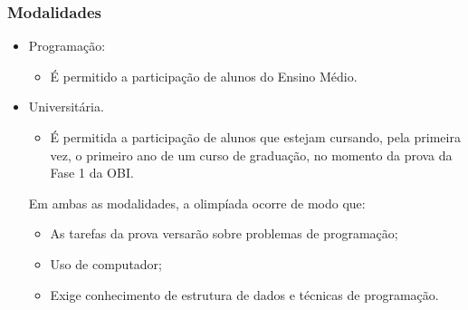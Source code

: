 \begin{frame}
 \frametitle{Modalidades}
 \begin{itemize}
  \item Programação:
  \begin{itemize}
   \item É permitido a participação de alunos do Ensino Médio.
  \end{itemize}

  \item Universitária.
  \begin{itemize}
   \item É permitida a participação de alunos que estejam cursando, pela primeira vez,
   o primeiro ano de um curso de graduação, no momento da prova da Fase 1 da OBI.
  \end{itemize}

  Em ambas as modalidades, a olimpíada ocorre de modo que:
  \begin{itemize}
   \item As tarefas da prova versarão sobre problemas de programação;
   \item Uso de computador;
   \item Exige conhecimento de estrutura de dados e técnicas de programação.
  \end{itemize}

 \end{itemize}

\end{frame}

